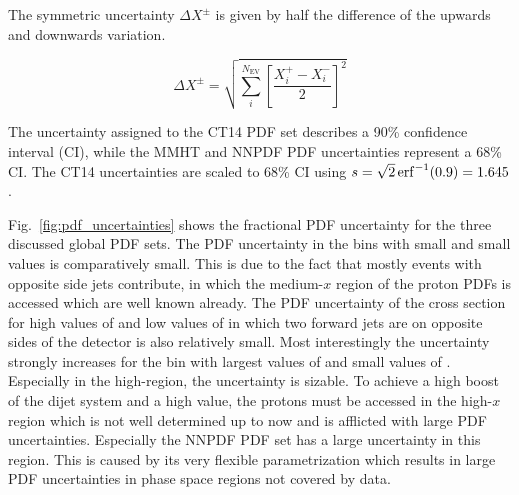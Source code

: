 The symmetric uncertainty $\Delta X^{\pm}$ is given by half the difference of the upwards and
downwards variation.

\begin{equation*}
    \Delta X^{\pm} = \sqrt{\sum_i^{N_{\mathrm{EV}}} \left[ \frac{X_i^+ -
    X_i^-}{2} \right]^2}
\end{equation*}

The uncertainty assigned to the CT14 PDF set describes a 90\% confidence
interval (CI), while the MMHT and NNPDF PDF uncertainties represent a 68\% CI.
The CT14 uncertainties are scaled to 68\% CI using $s = \sqrt{2}
\operatorname{erf}^{-1}(0.9) = 1.645$.

Fig.~\ref{fig:pdf_uncertainties} shows the fractional PDF uncertainty for the
three discussed global PDF sets. The PDF uncertainty in the bins with small
\ystar and small \yboost values is comparatively small. This is due to the fact
that mostly events with opposite side jets contribute, in which the medium-$x$
region of the proton PDFs is accessed which are well known already. The PDF
uncertainty of the cross section for high values of \ystar and low values of
\yboost in which two forward jets are on opposite sides of the detector is also
relatively small. Most interestingly the uncertainty strongly increases for the
bin with largest values of \yboost and small values of \ystar.  Especially in
the high-\pt region, the uncertainty is sizable. To achieve a high boost of the
dijet system and a high \ptavg value, the protons must be accessed in the
high-$x$ region which is not well determined up to now and is afflicted with
large PDF uncertainties. Especially the NNPDF PDF set has a large uncertainty in
this region. This is caused by its very flexible parametrization which results
in large PDF uncertainties in phase space regions not covered by data.

